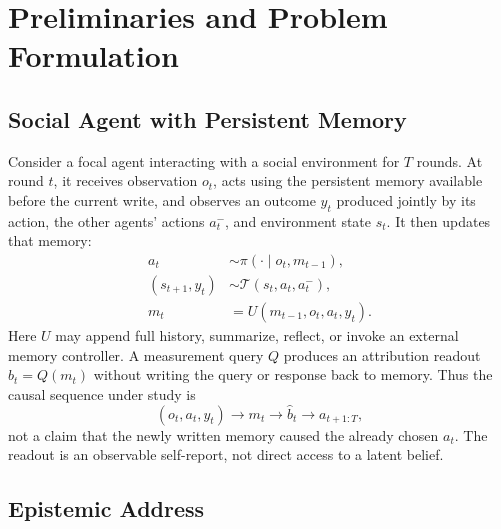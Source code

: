 \documentclass[sigconf,anonymous]{acmart}
\begin{document}
\section{Preliminaries and Problem Formulation}
\label{sec:prelim}

\subsection{Social Agent with Persistent Memory}

Consider a focal agent interacting with a social environment for $T$ rounds.
At round $t$, it receives observation $o_t$, acts using the persistent memory
available before the current write, and observes an outcome $y_t$ produced
jointly by its action, the other agents' actions $a_t^{-}$, and environment
state $s_t$. It then updates that memory:
\begin{equation}
  \begin{aligned}
    a_t &\sim \pi(\cdot \mid o_t,m_{t-1}),\\
    (s_{t+1},y_t)&\sim\mathcal{T}(s_t,a_t,a_t^{-}),\\
    m_t &= U(m_{t-1},o_t,a_t,y_t).
  \end{aligned}
  \label{eq:agent-loop}
\end{equation}
Here $U$ may append full history, summarize, reflect, or invoke an external
memory controller. A measurement query $Q$ produces an attribution readout
$\hat b_t=Q(m_t)$ without writing the query or response back to memory. Thus the
causal sequence under study is
\begin{equation}
  (o_t,a_t,y_t) \longrightarrow m_t \longrightarrow \hat b_t
  \longrightarrow a_{t+1:T},
  \label{eq:chain}
\end{equation}
not a claim that the newly written memory caused the already chosen $a_t$.
The readout is an observable self-report, not direct access to a latent belief.

\subsection{Epistemic Address}
\end{document}
